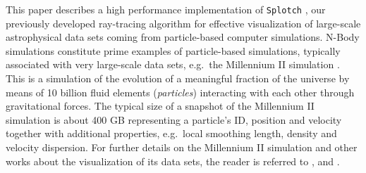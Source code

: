 \documentclass[1p,times]{elsarticle}
\begin{document}
%

This paper describes a high performance implementation of 
{\tt Splotch} \citep{2008NJPh...10l5006D}, our previously developed ray-tracing 
algorithm for effective visualization of large-scale astrophysical data sets coming 
from particle-based computer simulations. N-Body simulations constitute 
prime examples of particle-based simulations, typically associated with very 
large-scale data sets, e.g.\ the Millennium II simulation \citep{2009MNRAS.398.1150B}.
This is a simulation of the evolution of a meaningful fraction of the universe 
by means of 10 billion fluid elements ({\it particles}) interacting with each other 
through gravitational forces. The typical size of a snapshot of the Millennium II 
simulation is about 400 GB representing a particle's ID, position and velocity
together with additional properties, e.g.\ local smoothing length, density and 
velocity dispersion. For further details on the Millennium II simulation and
other works about the visualization of its data sets, the reader
is referred to \citep{2009MNRAS.398.1150B}, \cite{fraedrich2009} and \cite{Szalay2008}.
\end{document}

